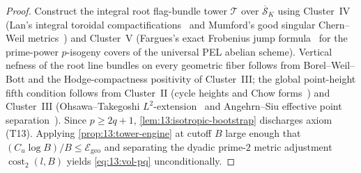 \begin{proof}
Construct the integral root flag-bundle tower $\mathcal{T}$ over $\overline{\mathcal{S}}_K$ using Cluster~IV (Lan's integral toroidal compactifications~\cite{Lan2013} and Mumford's good singular Chern--Weil metrics~\cite{Mumford1977}) and Cluster~V (Fargues's exact Frobenius jump formula~\cite{Fargues2010} for the prime-power $p$-isogeny covers of the universal PEL abelian scheme). Vertical nefness of the root line bundles on every geometric fiber follows from Borel--Weil--Bott and the Hodge-compactness positivity of Cluster~III; the global point-height fifth condition follows from Cluster~II (cycle heights and Chow forms~\cite{BostGilletSoule1994,Zhang1995}) and Cluster~III (Ohsawa--Takegoshi $L^2$-extension~\cite{OhsawaTakegoshi1987} and Angehrn--Siu effective point separation~\cite{AngehrnSiu1995}). Since $p \ge 2q + 1$, \cref{lem:13:isotropic-bootstrap} discharges axiom (T13). Applying \cref{prop:13:tower-engine} at cutoff $B$ large enough that $(C_u \log B)/B \le \mathcal{E}_{\mathrm{geo}}$ and separating the dyadic prime-$2$ metric adjustment $\operatorname{cost}_2(l, B)$ yields \eqref{eq:13:vol-pq} unconditionally.
\end{proof}

